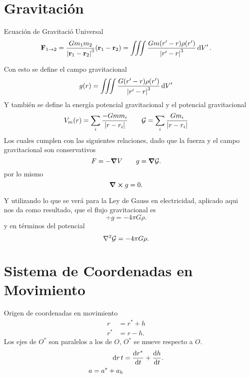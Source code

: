 \chapter{Gravitación}
Ecuación de Gravitació Universal
\begin{equation}
	\vb{F} _{1\to 2} = \frac{Gm_1 m_2}{\abs{\vb{r}_1 - \vb{r}_2}^3} \qty(\vb{r}_1 - \vb{r}_2) = \iiint \frac{Gm (r' - r) \rho (r')}{\abs{r' - r}^3} \dd{V'} .
\end{equation}

Con esto se define el campo gravitacional
\begin{equation}
	g(r) = \iiint \frac{G (r' - r) \rho (r')}{\abs{r' - r}^3} \dd{V'}
\end{equation}
Y también se define la energía potencial gravitacional y el potencial gravitacional
\begin{equation}
	V_m (r) = \sum _i \frac{-Gmm_i}{\abs{r - r_i}} \qquad \mathcal{G} = \sum _i \frac{Gm_i}{\abs{r - r_i}}
\end{equation}
Los cuales cumplen con las siguientes relaciones, dado que la fuerza y el campo gravitacional son conservativos
\begin{equation}
	F = -\grad{V} \qquad g = \grad{\mathcal{G}}.
\end{equation}
por lo mismo
\begin{equation}
	\curl{g} = 0.
\end{equation}

Y utilizando lo que se verá para la Ley de Gauss en electricidad, aplicado aqui nos da como resultado, que el flujo gravitacional es
\begin{equation}
	\div{g} = -4\pi G\rho .
\end{equation}
y en términos del potencial
\begin{equation}
	\laplacian{\mathcal{G}} = -4\pi G\rho .
\end{equation}





\chapter{Sistema de Coordenadas en Movimiento}

Origen de coordenadas en movimiento
\begin{align*}
	r &= r^* + h \\
	r^* &= r - h .
\end{align*}
Los ejes de $O^*$ son paralelos a los de $O$, $O^*$ se mueve respecto a $O$.
\begin{align*}
	\dd{r}{t} &= \dv{r^*}{t} + \dv{h}{t}. \\
	a = a^* + a_h
\end{align*}

